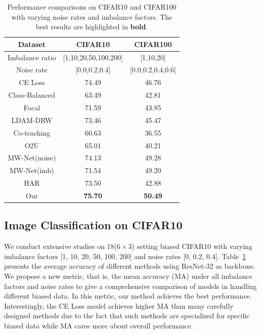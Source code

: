 \documentclass[letterpaper]{article} %
\newcommand{\bd}[1]{\textbf{#1}}
\begin{document}
\begin{table}[t]
\begin{center}
\begin{adjustbox}{max width=0.4\textwidth}
\begin{tabular}{c|c|c}
\hline
Dataset & CIFAR10 & CIFAR100 \\
\hline
Imbalance ratio & [1,10,20,50,100,200] & [1,10,20] \\
\hline
Noise rate & [0.0,0.2,0.4] & [0.0,0.2,0.4,0.6] \\
\hline
\hline
CE Loss  & 74.49 & 46.76 \\
\hline
\hline
Class-Balanced & 63.49 & 42.81 \\
\hline
Focal & 71.59 & 43.85 \\
\hline
LDAM-DRW & 73.46 & 45.47  \\
\hline
\hline
Co-teaching & 60.63 & 36.55   \\
\hline
O2U & 65.01 & 40.21  \\
\hline
\hline
MW-Net(noise) & 74.13 & 49.28  \\
MW-Net(imb) & 71.54 & 49.20 \\
HAR& 73.50 & 42.88 \\
\hline
\hline
Our & \bd{75.70} & \bd{50.49}  \\
\hline
\end{tabular}
\end{adjustbox}
\vspace{-0.3cm}
\caption{Performance comparisons on CIFAR10 and CIFAR100 with varying noise rates and imbalance factors.
The best results are highlighted in \bd{bold}.}
\label{tab:cifar10_res}
\end{center}
\vspace{-0.5cm}
\end{table}

\subsection{Image Classification on CIFAR10} \label{sec:vis_cifar10}

We conduct extensive studies on 18($6 \times 3$) setting biased CIFAR10 with varying imbalance factors [1, 10, 20, 50, 100, 200] and noise rates [0, 0.2, 0.4].
Table~\ref{tab:cifar10_res} presents the average accuracy of different methods using ResNet-32 as backbone.
We propose a new metric, that is, the mean accuracy (MA) under all imbalance factors and noise rates to give a comprehensive comparison of models in handling different biased data. 
In this metric, our method achieves the best performance.
Interestingly, the CE Loss model achieves higher MA than many carefully designed methods due to the fact that such methods are specialized for specific biased data while MA cares more about overall performance.
\end{document}
